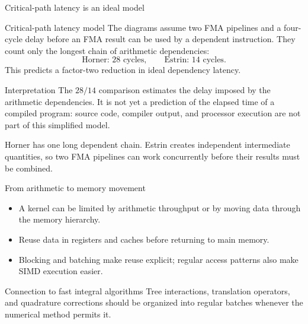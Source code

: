\documentclass[aspectratio=169,11pt]{beamer}
\begin{document}
\begin{frame}{Critical-path latency is an ideal model}
\small
\begin{block}{Critical-path latency model}
The diagrams assume two FMA pipelines and a four-cycle delay before an FMA
result can be used by a dependent instruction.  They count only the longest
chain of arithmetic dependencies:
\[
  \text{Horner: }28\text{ cycles},
  \qquad
  \text{Estrin: }14\text{ cycles}.
\]
This predicts a factor-two reduction in ideal dependency latency.
\end{block}
\begin{block}{Interpretation}
The $28/14$ comparison estimates the delay imposed by the arithmetic
dependencies.  It is not yet a prediction of the elapsed time of a compiled
program: source code, compiler output, and processor execution are not part
of this simplified model.

\smallskip
Horner has one long dependent chain.  Estrin creates independent intermediate
quantities, so two FMA pipelines can work concurrently before their results
must be combined.
\end{block}
\end{frame}

\begin{frame}{From arithmetic to memory movement}
\small
\begin{itemize}
  \item A kernel can be limited by arithmetic throughput or by moving data
        through the memory hierarchy.
  \item Reuse data in registers and caches before returning to main memory.
  \item Blocking and batching make reuse explicit; regular access patterns
        also make SIMD execution easier.
\end{itemize}
\begin{block}{Connection to fast integral algorithms}
Tree interactions, translation operators, and quadrature corrections should be
organized into regular batches whenever the numerical method permits it.
\end{block}
\end{frame}
\end{document}
